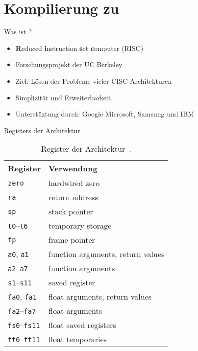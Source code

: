 \section{Kompilierung zu \riscv}
\begin{frame}{Was ist \riscv?}
	\begin{itemize}
        \item \textbf{R}educed \textbf{i}nstruction \textbf{s}et \textbf{c}omputer (RISC)
        \item Forschungsprojekt der UC Berkeley
		\item Ziel: Lösen der Probleme vieler CISC Architekturen
        \item Simplizität und Erweiterbarkeit
        \item Unterstüztung durch: Google Microsoft, Samsung und IBM
	\end{itemize}
\end{frame}

\begin{frame}{Registers der \riscv{} Architektur }
	\begin{table}
		\centering
		\caption[Registers der \riscv{} Architektur.]{Register der \riscv{} Architektur~\cite[p.~155]{Waterman2019}.}\label{tbl:riscv_regs}
		\begin{tabularx}{\linewidth}{l|L}
			 Register & Verwendung                        \\ \hline
			\texttt{zero}               & hardwired zero                    \\ \hline
			\texttt{ra}                 & return address                    \\ \hline
			\texttt{sp}                 & stack pointer                     \\ \hline
			\texttt{t0}--\texttt{t6}    & temporary storage                 \\ \hline
			\texttt{fp}                 & frame pointer                     \\ \hline
			\texttt{a0}, \texttt{a1}    & function arguments, return values \\ \hline
			\texttt{a2}--\texttt{a7}    & function arguments                \\ \hline
			\texttt{s1}--\texttt{s11}   & saved register                    \\ \hline
			\texttt{fa0}, \texttt{fa1}  & float arguments, return values    \\ \hline
			\texttt{fa2}--\texttt{fa7}  & float arguments                   \\ \hline
			\texttt{fs0}--\texttt{fs11} & float saved registers             \\ \hline
			\texttt{ft0}--\texttt{ft11} & float temporaries                 \\
		\end{tabularx}
	\end{table}
\end{frame}

